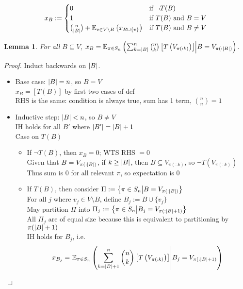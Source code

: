 \documentclass{article}
\begin{document}
\[
x_B :=
\begin{cases}
  0 & \text{if $\lnot T(B)$} \\
  1 & \text{if $T(B)$ and $B = V$} \\
  \binom{n}{\left\vert B \right\vert}+\mathbb{E}_{v \in V \setminus B}\left(x_{B \cup \{v\}}\right) & \text{if $T(B)$ and $B \neq V$}
\end{cases}
\]
\newtheorem{lemma}{Lemma}
\newtheorem{theorem}{Theorem}
\begin{lemma}
  For all $B \subseteq V$, $x_B = \mathbb{E}_{\pi \in S_n}\left(\sum_{k=\left\vert B \right\vert}^n\binom{n}{k}\left[T\left(V_{\pi(:k)}\right)\right] \middle| B = V_{\pi(:\left\vert B \right\vert)}\right)$.
\end{lemma}
\begin{proof}
Induct backwards on $\left\vert B \right\vert$.
\begin{itemize}
\item
  Base case: $\left\vert B \right\vert = n$, so $B = V$ \\
  $x_B = [T(B)]$ by first two cases of def \\
  RHS is the same: condition is always true, sum has 1 term, $\binom{n}{n} = 1$
\item
  Inductive step: $\left\vert B \right\vert < n$, so $B \neq V$ \\
  IH holds for all $B'$ where $\left\vert B' \right\vert = \left\vert B \right\vert+1$ \\
  Case on $T(B)$
  \begin{itemize}
  \item
    If $\lnot T(B)$, then $x_B = 0$; WTS RHS $ = 0$ \\
    Given that $B = V_{\pi(:\left\vert B \right\vert)}$, if $k \geq \left\vert B \right\vert$, then $B \subseteq V_{\pi(:k)}$,
    so $\lnot T(V_{\pi(:k)})$ \\
    Thus sum is $0$ for all relevant $\pi$, so expectation is $0$
  \item
    If $T(B)$, then consider $\Pi := \left\{\pi \in S_n \middle| B = V_{\pi(:\left\vert B \right\vert)}\right\}$ \\
    For all $j$ where $v_j \in V \setminus B$, define $B_j := B \cup \{v_j\}$ \\
    May partition $\Pi$ into $\Pi_j := \left\{\pi \in S_n \middle| B_j = V_{\pi(:\left\vert B \right\vert+1)}\right\}$ \\
    All $\Pi_j$ are of equal size because this is equivalent to partitioning by $\pi(\left\vert B \right\vert+1)$ \\
    IH holds for $B_j$, i.e.
    \begin{align*}
      x_{B_j}
      =\ &\E_{\pi \in S_n}\left(\sum_{k=\abs{B}+1}^n\binom{n}{k}\left[T\left(V_{\pi(:k)}\right)\right] \middle| B_j = V_{\pi(:\abs{B}+1)}\right) \\

\end{align*}
\end{itemize}
\end{itemize}
\end{proof}
\end{document}
